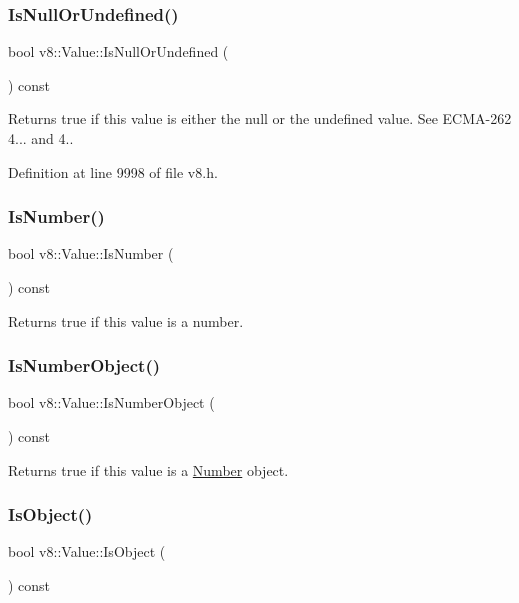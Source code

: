 \subsubsection{\texorpdfstring{Is\+Null\+Or\+Undefined()}{IsNullOrUndefined()}}
{\footnotesize\ttfamily bool v8\+::\+Value\+::\+Is\+Null\+Or\+Undefined (\begin{DoxyParamCaption}{ }\end{DoxyParamCaption}) const}

Returns true if this value is either the null or the undefined value. See E\+C\+M\+A-\/262 4... and 4.. 

Definition at line 9998 of file v8.\+h.

\mbox{\label{classv8_1_1Value_a6ef42a28c0bc70022acb7e308bda4e19}} 
\subsubsection{\texorpdfstring{Is\+Number()}{IsNumber()}}
{\footnotesize\ttfamily bool v8\+::\+Value\+::\+Is\+Number (\begin{DoxyParamCaption}{ }\end{DoxyParamCaption}) const}

Returns true if this value is a number. \mbox{\label{classv8_1_1Value_a497018ef8c5ed946e1c0c30554bad3f8}} 
\subsubsection{\texorpdfstring{Is\+Number\+Object()}{IsNumberObject()}}
{\footnotesize\ttfamily bool v8\+::\+Value\+::\+Is\+Number\+Object (\begin{DoxyParamCaption}{ }\end{DoxyParamCaption}) const}

Returns true if this value is a \mbox{\hyperlink{classv8_1_1Number}{Number}} object. \mbox{\label{classv8_1_1Value_a72a01e06e897a8fedbb430cdd7fc3ffe}} 
\subsubsection{\texorpdfstring{Is\+Object()}{IsObject()}}
{\footnotesize\ttfamily bool v8\+::\+Value\+::\+Is\+Object (\begin{DoxyParamCaption}{ }\end{DoxyParamCaption}) const}

